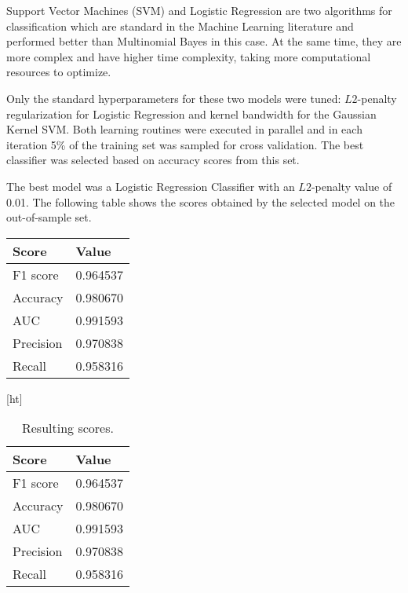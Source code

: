 Support Vector Machines (SVM) and Logistic Regression are two algorithms for classification which are standard in the Machine Learning literature and performed better than Multinomial Bayes in this case.
At the same time, they are more complex and have higher time complexity, taking more computational resources to optimize.

Only the standard hyperparameters for these two models were tuned: $L2$-penalty regularization for Logistic Regression and kernel bandwidth for the Gaussian Kernel SVM.\@
Both learning routines were executed in parallel and in each iteration 5\% of the training set was sampled for cross validation. The best classifier was selected based on accuracy scores from this set.



The best model was a Logistic Regression Classifier with an $L2$-penalty value of 0.01.
The following table
shows the scores obtained by the selected model on the out-of-sample set.

\begin{center}
	\begin{tabular}{ l l }
		\toprule
		Score & Value \\
		\midrule
		F1 score & 0.964537  \\
		Accuracy & 0.980670  \\
		AUC    & 0.991593  \\
		Precision & 0.970838  \\
		Recall  & 0.958316  \\
		\bottomrule
	\end{tabular}
\end{center}


\begin{table}\label{tab:results}[ht]
	\caption{Resulting scores.}

	\centering
	\begin{tabular}{ l l }
		\toprule
		Score & Value \\
		\midrule
		F1 score & 0.964537  \\
		Accuracy & 0.980670  \\
		AUC    & 0.991593  \\
		Precision & 0.970838  \\
		Recall  & 0.958316  \\
		\bottomrule
	\end{tabular}
\end{table}

